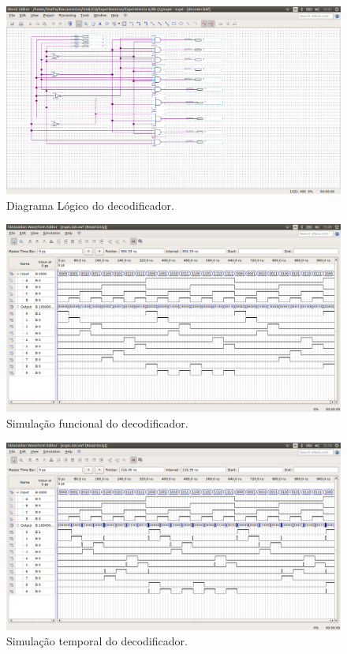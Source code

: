 \documentclass[12pt]{article}
\begin{document}
\begin{figure}[H]
	\centering
	\includegraphics[width=1\textwidth]{decoder.png}
	\caption{Diagrama Lógico do decodificador.}
	\label{fig:decoder}
\end{figure}

\begin{figure}[H]
	\centering
	\includegraphics[width=1\textwidth]{functionaldecoder.png}
	\caption{Simulação funcional do decodificador.}
	\label{fig:funcdecoder}
\end{figure}

\begin{figure}[H]
	\centering
	\includegraphics[width=1\textwidth]{timingdecoder.png}
	\caption{Simulação temporal do decodificador.}
	\label{fig:timedecoder}
\end{figure}
\end{document}
